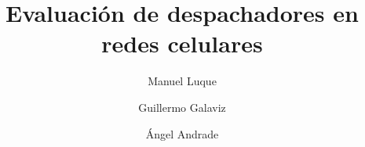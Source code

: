 \documentclass{ifacconf}
\begin{document}
\begin{frontmatter}

\title{Evaluación de despachadores en redes celulares}

\author[UABC]{Manuel Luque}
\author[UABC]{Guillermo Galaviz}
\author[UABC]{Ángel Andrade}

\address[UABC]{Universidad Autónoma de Baja California}

\begin{abstract}
\end{abstract}

\begin{keyword}
\end{keyword}

\end{frontmatter}

% 



% 

\end{document}
